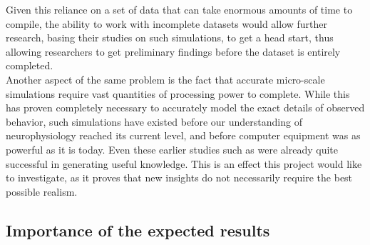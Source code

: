 \documentclass[a4paper,11pt]{article}
\begin{document}
Given this reliance on a set of data that can take enormous amounts of time to compile, the ability to work with incomplete datasets would allow further research, basing their studies on such simulations, to get a head start, thus allowing researchers to get preliminary findings before the dataset is entirely completed. \\[0,2cm]

Another aspect of the same problem is the fact that accurate micro-scale simulations require vast quantities of processing power to complete. While this has proven completely necessary to accurately model the exact details of observed behavior, such simulations have existed before our understanding of neurophysiology reached its current level, and before computer equipment was as powerful as it is today. Even these earlier studies such as \citep{Kimura2005} were already quite successful in generating useful knowledge. This is an effect this project would like to investigate, as it proves that new insights do not necessarily require the best possible realism. 


\subsection{Importance of the expected results}
\end{document}
